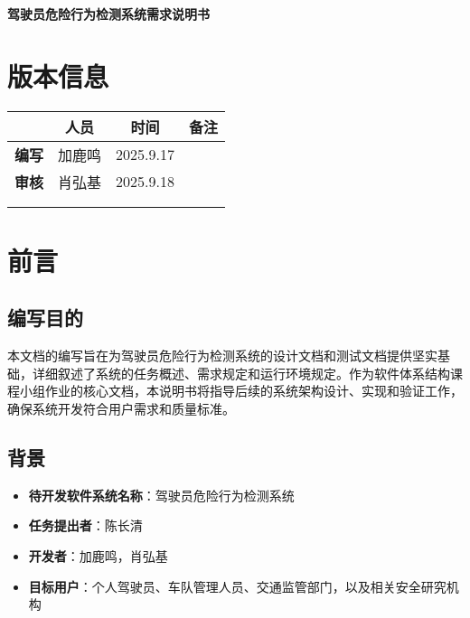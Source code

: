 \documentclass[a4paper,12pt]{article}
\begin{document}
\begin{center}
    \textbf{\LARGE 驾驶员危险行为检测系统需求说明书}
\end{center}

\section*{版本信息}
\begin{table}[h]
    \centering
    \begin{tabular}{|c|c|c|c|}
        \hline
        & \textbf{人员} & \textbf{时间} & \textbf{备注} \\
        \hline
        \textbf{编写} & 加鹿鸣 & 2025.9.17 & \\
        \hline
        \textbf{审核} & 肖弘基 & 2025.9.18 & \\
        \hline
        & & & \\
        \hline
        & & & \\
        \hline
    \end{tabular}
\end{table}

\tableofcontents
\newpage

\section{前言}

\subsection{编写目的}
本文档的编写旨在为驾驶员危险行为检测系统的设计文档和测试文档提供坚实基础，详细叙述了系统的任务概述、需求规定和运行环境规定。作为软件体系结构课程小组作业的核心文档，本说明书将指导后续的系统架构设计、实现和验证工作，确保系统开发符合用户需求和质量标准。

\subsection{背景}
\begin{itemize}
    \item \textbf{待开发软件系统名称}：驾驶员危险行为检测系统
    \item \textbf{任务提出者}：陈长清
    \item \textbf{开发者}：加鹿鸣，肖弘基
    \item \textbf{目标用户}：个人驾驶员、车队管理人员、交通监管部门，以及相关安全研究机构
\end{itemize}
\end{document}
